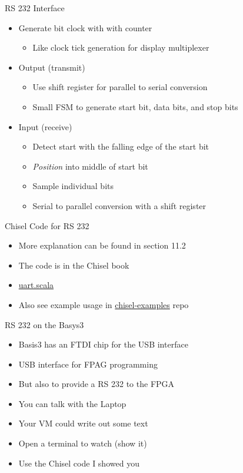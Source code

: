 \begin{frame}[fragile]{RS 232 Interface}
\begin{itemize}
\item Generate bit clock with with counter
\begin{itemize}
\item Like clock tick generation for display multiplexer
\end{itemize}
\item Output (transmit)
\begin{itemize}
\item Use shift register for parallel to serial conversion
\item Small FSM to generate start bit, data bits, and stop bits
\end{itemize}
\item Input (receive)
\begin{itemize}
\item Detect start with the falling edge of the start bit
\item \emph{Position} into middle of start bit
\item Sample individual bits
\item Serial to parallel conversion with a shift register
\end{itemize}
\end{itemize}
\end{frame}


\begin{frame}[fragile]{Chisel Code for RS 232}
\begin{itemize}
\item More explanation can be found in section 11.2
\item The code is in the Chisel book
\item \href{https://github.com/schoeberl/chisel-book/blob/master/src/main/scala/uart.scala}{uart.scala}
\item Also see example usage in \href{https://github.com/schoeberl/chisel-examples}{chisel-examples} repo
\end{itemize}
\end{frame}

\begin{frame}[fragile]{RS 232 on the Basys3}
\begin{itemize}
\item Basis3 has an FTDI chip for the USB interface
\item USB interface for FPAG programming
\item But also to provide a RS 232 to the FPGA
\item You can talk with the Laptop
\item Your VM could write out some text
\item Open a terminal to watch (show it)
\item Use the Chisel code I showed you
\end{itemize}
\end{frame}

